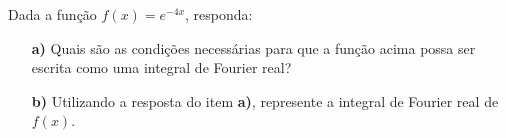 \linespread{1.5}
Dada a função $f(x) = e^{-4x}$, responda:
\begin{itemize}
    \item[\textbf{a)}] Quais são as condições necessárias para que a função acima possa ser escrita como uma integral de Fourier real?
    \item[\textbf{b)}] Utilizando a resposta do item \textbf{a)}, represente a integral de Fourier real de $f(x)$.
\end{itemize}